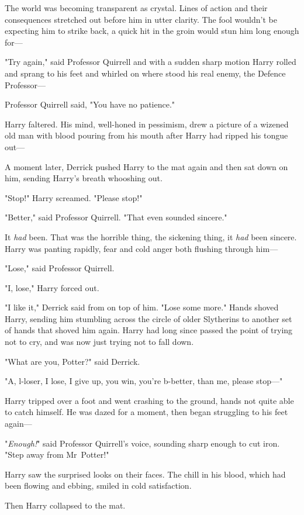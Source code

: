 The world was becoming transparent as crystal. Lines of action and their
consequences stretched out before him in utter clarity. The fool wouldn't be
expecting him to strike back, a quick hit in the groin would stun him long
enough for---

"Try again," said Professor Quirrell and with a sudden sharp motion Harry
rolled and sprang to his feet and whirled on where stood his real enemy, the
Defence Professor---

Professor Quirrell said, "You have no patience."

Harry faltered. His mind, well-honed in pessimism, drew a picture of a wizened
old man with blood pouring from his mouth after Harry had ripped his tongue
out---

A moment later, Derrick pushed Harry to the mat again and then sat down on him,
sending Harry's breath whooshing out.

"Stop!" Harry screamed. "Please stop!"

"Better," said Professor Quirrell. "That even sounded sincere."

It \emph{had} been. That was the horrible thing, the sickening thing, it
\emph{had} been sincere. Harry was panting rapidly, fear and cold anger both
flushing through him---

"Lose," said Professor Quirrell.

"I, lose," Harry forced out.

"I like it," Derrick said from on top of him. "Lose some more."
\later
Hands shoved Harry, sending him stumbling across the circle of older Slytherins
to another set of hands that shoved him again. Harry had long since passed the
point of trying not to cry, and was now just trying not to fall down.

"What are you, Potter?" said Derrick.

"A, l-loser, I lose, I give up, you win, you're b-better, than me, please
stop---"

Harry tripped over a foot and went crashing to the ground, hands not quite able
to catch himself. He was dazed for a moment, then began struggling to his feet
again---

"\emph{Enough!}" said Professor Quirrell's voice, sounding sharp enough to cut
iron. "Step away from Mr~Potter!"

Harry saw the surprised looks on their faces. The chill in his blood, which had
been flowing and ebbing, smiled in cold satisfaction.

Then Harry collapsed to the mat.


